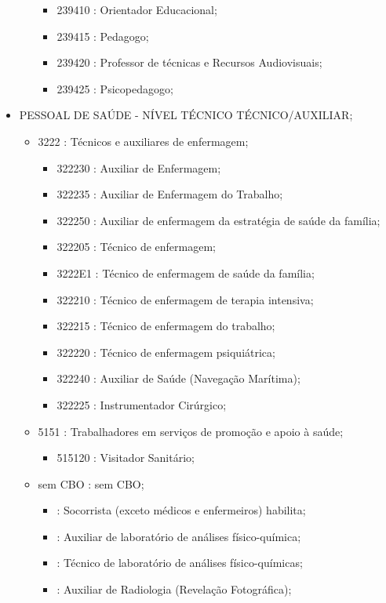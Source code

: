 \begin{itemize}
\begin{itemize}
\begin{itemize}
      \item 239410 : Orientador Educacional;
      \item 239415 : Pedagogo;
      \item 239420 : Professor de técnicas e Recursos Audiovisuais;
      \item 239425 : Psicopedagogo;
    \end{itemize}
  \end{itemize}
  \item PESSOAL DE SAÚDE - NÍVEL TÉCNICO TÉCNICO/AUXILIAR;
  \begin{itemize}
    \item 3222 : Técnicos e auxiliares de enfermagem;
    \begin{itemize}
      \item 322230 : Auxiliar de Enfermagem;
      \item 322235 : Auxiliar de Enfermagem do Trabalho;
      \item 322250 : Auxiliar de enfermagem da estratégia de saúde da família;
      \item 322205 : Técnico de enfermagem;
      \item 3222E1 : Técnico de enfermagem de saúde da família;
      \item 322210 : Técnico de enfermagem de terapia intensiva;
      \item 322215 : Técnico de enfermagem do trabalho;
      \item 322220 : Técnico de enfermagem psiquiátrica;
      \item 322240 : Auxiliar de Saúde (Navegação Marítima);
      \item 322225 : Instrumentador Cirúrgico;
    \end{itemize}
    \item 5151 : Trabalhadores em serviços de promoção e apoio à saúde;
    \begin{itemize}
      \item 515120 : Visitador Sanitário;
    \end{itemize}
    \item sem CBO : sem CBO;
    \begin{itemize}
      \item  : Socorrista (exceto médicos e enfermeiros) habilita;
      \item  : Auxiliar de laboratório de análises físico-química;
      \item  : Técnico de laboratório de análises físico-químicas;
      \item  : Auxiliar de Radiologia (Revelação Fotográfica);

\end{itemize}
\end{itemize}
\end{itemize}
